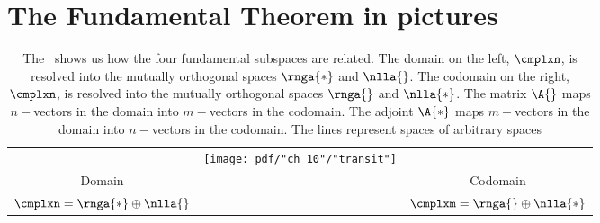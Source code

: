 \break
\clearpage

\section{The Fundamental Theorem in pictures}

\begin{landscape}
\thispagestyle{empty}

\begin{table}[htdp]
\begin{center}
\begin{tabular}{c c c}
\includegraphics[ width = 2.5in ] {pdf/"ch 10"/"domain ortho"} &
\texttt{[image: pdf/"ch 10"/"transit"]} &
\includegraphics[ width = 2.5in ] {pdf/"ch 10"/"codomain ortho"} \\
Domain &&
Codomain \\
$\cmplxn = \rnga{*} \oplus \nlla{}$ &&
$\cmplxm = \rnga{} \oplus \nlla{*}$ \\
\end{tabular}
\end{center}
\label{default}
\caption[The \ftola]{The \ftola\ shows us how the four fundamental subspaces are related. The domain on the left, $\cmplxn$, is resolved into the mutually orthogonal spaces $\rnga{*}$ and $\nlla{}$. The codomain on the right, $\cmplxn$, is resolved into the mutually orthogonal spaces $\rnga{}$ and $\nlla{*}$. The matrix $\A{}$ maps $n-$vectors in the domain into $m-$vectors in the codomain. The adjoint $\A{*}$ maps $m-$vectors in the domain into $n-$vectors in the codomain. The lines represent spaces of arbitrary spaces}
\end{table}%

\end{landscape}

\endinput